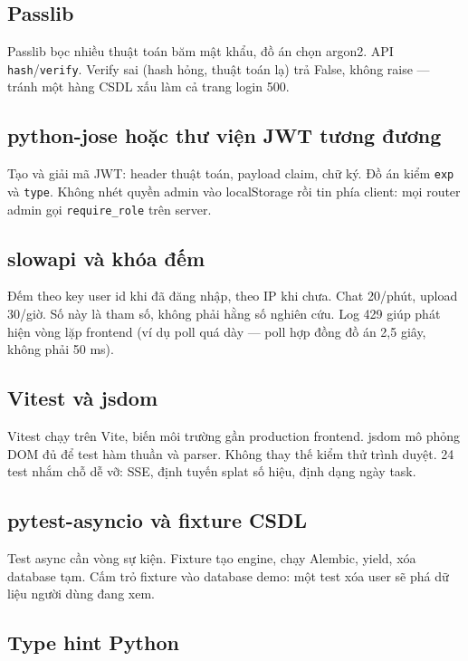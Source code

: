\subsection{Passlib}

Passlib bọc nhiều thuật toán băm mật khẩu, đồ án chọn argon2. API
\texttt{hash}/\texttt{verify}. Verify sai (hash hỏng, thuật toán lạ) trả False,
không raise --- tránh một hàng CSDL xấu làm cả trang login 500.

\subsection{python-jose hoặc thư viện JWT tương đương}

Tạo và giải mã JWT: header thuật toán, payload claim, chữ ký. Đồ án kiểm
\texttt{exp} và \texttt{type}. Không nhét quyền admin vào localStorage rồi tin
phía client: mọi router admin gọi \texttt{require\_role} trên server.

\subsection{slowapi và khóa đếm}

Đếm theo key user id khi đã đăng nhập, theo IP khi chưa. Chat 20/phút, upload
30/giờ. Số này là tham số, không phải hằng số nghiên cứu. Log 429 giúp phát hiện
vòng lặp frontend (ví dụ poll quá dày --- poll hợp đồng đồ án 2,5 giây, không
phải 50 ms).

\subsection{Vitest và jsdom}

Vitest chạy trên Vite, biến môi trường gần production frontend. jsdom mô phỏng
DOM đủ để test hàm thuần và parser. Không thay thế kiểm thử trình duyệt. 24 test
nhắm chỗ dễ vỡ: SSE, định tuyến splat số hiệu, định dạng ngày task.

\subsection{pytest-asyncio và fixture CSDL}

Test async cần vòng sự kiện. Fixture tạo engine, chạy Alembic, yield, xóa database
tạm. Cấm trỏ fixture vào database demo: một test xóa user sẽ phá dữ liệu người
dùng đang xem.

\subsection{Type hint Python}

